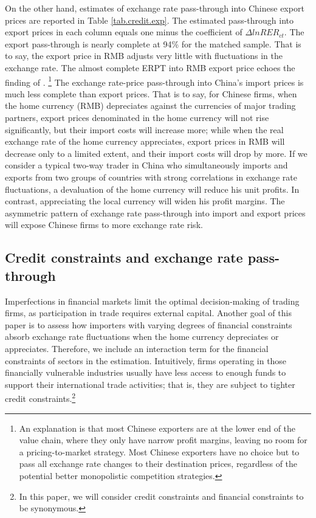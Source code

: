 On the other hand, estimates of exchange rate pass-through into Chinese export prices are reported in Table \ref{tab.credit.exp}. The estimated pass-through into export prices in each column equals one minus the coefficient of $\Delta lnRER_{ct}$. The export pass-through is nearly complete at 94\% for the matched sample. That is to say, the export price in RMB adjusts very little with fluctuations in the exchange rate. The almost complete ERPT into RMB export price echoes the finding of \cite{lmx2015}. \footnote{An explanation is that most Chinese exporters are at the lower end of the value chain, where they only have narrow profit margins, leaving no room for a pricing-to-market strategy. Most Chinese exporters have no choice but to pass all exchange rate changes to their destination prices, regardless of the potential better monopolistic competition strategies.} The exchange rate-price pass-through into China's import prices is much less complete than export prices. That is to say, for Chinese firms, when the home currency (RMB) depreciates against the currencies of major trading partners, export prices denominated in the home currency will not rise significantly, but their import costs will increase more; while when the real exchange rate of the home currency appreciates, export prices in RMB will decrease only to a limited extent, and their import costs will drop by more. If we consider a typical two-way trader in China who simultaneously imports and exports from two groups of countries with strong correlations in exchange rate fluctuations, a devaluation of the home currency will reduce his unit profits. In contrast, appreciating the local currency will widen his profit margins. The asymmetric pattern of exchange rate pass-through into import and export prices will expose Chinese firms to more exchange rate risk.

\subsection{Credit constraints and exchange rate pass-through} \label{Empirical-Credit}

Imperfections in financial markets limit the optimal decision-making of trading firms, as participation in trade requires external capital. Another goal of this paper is to assess how importers with varying degrees of financial constraints absorb exchange rate fluctuations when the home currency depreciates or appreciates. Therefore, we include an interaction term for the financial constraints of sectors in the estimation. Intuitively, firms operating in those financially vulnerable industries usually have less access to enough funds to support their international trade activities; that is, they are subject to tighter credit constraints.\footnote{In this paper, we will consider credit constraints and financial constraints to be synonymous.} 

